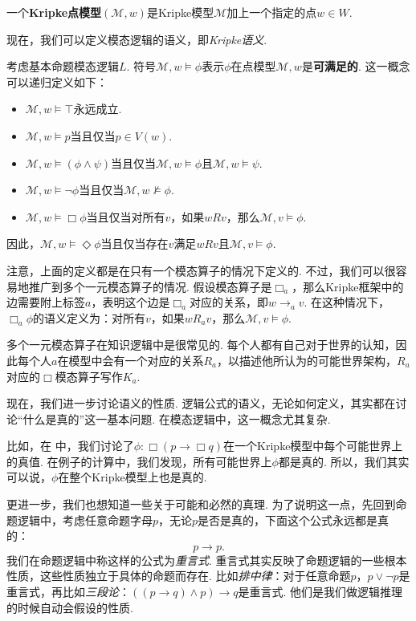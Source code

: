 \begin{definition}[Kripke点模型]
一个\textbf{Kripke点模型}$(\mathcal{M},w)$是Kripke模型$\mathcal M$加上一个指定的点$w\in W$. 
\end{definition}

现在，我们可以定义模态逻辑的语义，即\emph{Kripke语义}. 

\begin{definition}[Kripke语义]
考虑基本命题模态逻辑$L$. 符号$\mathcal M,w\vDash\phi$表示$\phi$在点模型$\mathcal M,w$是\textbf{可满足的}. 这一概念可以递归定义如下：
\begin{itemize}
\item $\mathcal M, w\vDash\top$永远成立. 
\item $\mathcal M, w\vDash p$当且仅当$p\in V(w)$. 
\item $\mathcal M, w\vDash (\phi\wedge\psi)$当且仅当$\mathcal M,w\vDash\phi$且$\mathcal M,w\vDash\psi$. 
\item $\mathcal M, w\vDash \neg\phi$当且仅当$\mathcal M,w\not\vDash\phi$. 
\item $\mathcal M, w\vDash \Box\phi$当且仅当对所有$v$，如果$wRv$，那么$\mathcal M,v\vDash\phi$. 
\end{itemize}
因此，$\mathcal M, w\vDash \Diamond\phi$当且仅当存在$v$满足$wRv$且$\mathcal M,v\vDash\phi$. 
\end{definition}

注意，上面的定义都是在只有一个模态算子的情况下定义的. 不过，我们可以很容易地推广到多个一元模态算子的情况. 假设模态算子是$\Box_a$，那么Kripke框架中的边需要附上标签$a$，表明这个边是$\Box_a$对应的关系，即$w\to_a v$. 在这种情况下，$\Box_a\phi$的语义定义为：对所有$v$，如果$wR_av$，那么$\mathcal M,v\vDash\phi$. 

多个一元模态算子在知识逻辑中是很常见的. 每个人都有自己对于世界的认知，因此每个人$a$在模型中会有一个对应的关系$R_a$，以描述他所认为的可能世界架构，$R_a$对应的$\Box$模态算子写作$K_a$. 

现在，我们进一步讨论语义的性质. 逻辑公式的语义，无论如何定义，其实都在讨论“什么是真的”这一基本问题. 在模态逻辑中，这一概念尤其复杂. 

比如，在 中，我们讨论了$\phi:\Box (p\to\Box q)$在一个Kripke模型中每个可能世界上的真值. 在例子的计算中，我们发现，所有可能世界上$\phi$都是真的. 所以，我们其实可以说，$\phi$在整个Kripke模型上也是真的. 

更进一步，我们也想知道一些关于可能和必然的真理. 为了说明这一点，先回到命题逻辑中，考虑任意命题字母$p$，无论$p$是否是真的，下面这个公式永远都是真的：
\[p\to p.\]
我们在命题逻辑中称这样的公式为\emph{重言式}. 重言式其实反映了命题逻辑的一些根本性质，这些性质独立于具体的命题而存在. 比如\emph{排中律}：对于任意命题$p$，$p\vee\neg p$是重言式，再比如\emph{三段论}：$((p\to q)\wedge p)\to q$是重言式. 他们是我们做逻辑推理的时候自动会假设的性质. 

